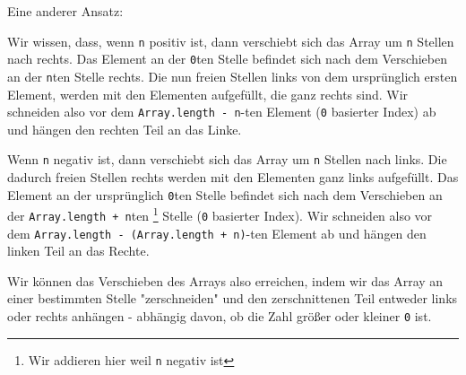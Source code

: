 \documentclass[babel]{book}
\begin{document}
Eine anderer Ansatz:

Wir wissen, dass, wenn \lstinline|n| positiv ist, dann verschiebt sich das Array um \lstinline|n| Stellen nach rechts. Das Element an der \lstinline|0|ten Stelle befindet sich nach dem Verschieben an der \lstinline|n|ten Stelle rechts. Die nun freien Stellen links von dem ursprünglich ersten Element, werden mit den Elementen aufgefüllt, die ganz rechts sind. Wir schneiden also vor dem \lstinline|Array.length - n|-ten Element (\lstinline|0| basierter Index) ab und hängen den rechten Teil an das Linke.

Wenn \lstinline|n| negativ ist, dann verschiebt sich das Array um \lstinline|n| Stellen nach links. Die dadurch freien Stellen rechts werden mit den Elementen ganz links aufgefüllt. Das Element an der ursprünglich \lstinline|0|ten Stelle befindet sich nach dem Verschieben an der \lstinline|Array.length + n|ten \footnote{Wir addieren hier weil \lstinline|n| negativ ist} Stelle (\lstinline|0| basierter Index). Wir schneiden also vor dem \lstinline|Array.length - (Array.length + n)|-ten Element ab und hängen den linken Teil an das Rechte. 

Wir können das Verschieben des Arrays also erreichen, indem wir das Array an einer bestimmten Stelle "zerschneiden" und den zerschnittenen Teil entweder links oder rechts anhängen - abhängig davon, ob die Zahl größer oder kleiner \lstinline|0| ist. 
\end{document}
